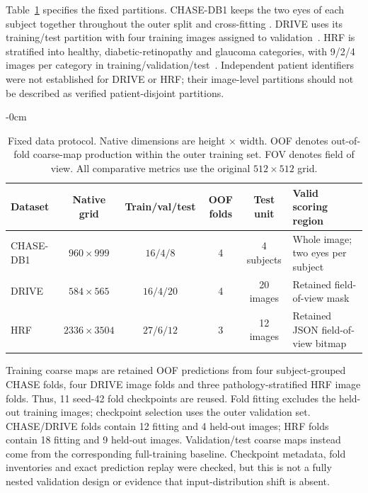 \documentclass[jimaging,article,submit,pdftex,moreauthors]{Definitions/mdpi}
\begin{document}
Table~\ref{tab:protocol} specifies the fixed partitions. CHASE-DB1 keeps the two
eyes of each subject together throughout the outer split and cross-fitting
\cite{Fraz2012}. DRIVE uses its training/test partition with four training
images assigned to validation~\cite{Staal2004}. HRF is stratified into healthy,
diabetic-retinopathy and glaucoma categories, with 9/2/4 images per category in
training/validation/test~\cite{Odstrcilik2013}. Independent patient identifiers
were not established for DRIVE or HRF; their image-level partitions should not
be described as verified patient-disjoint partitions.

\begin{table}[htbp]
\caption{Fixed data protocol. Native dimensions are height $\times$ width.
OOF denotes out-of-fold coarse-map production within the outer training set.
FOV denotes field of view.
All comparative metrics use the original $512\times512$ grid.}
\label{tab:protocol}
\begin{adjustwidth}{-\extralength}{0cm}
\centering\small
\begin{tabularx}{\linewidth}{@{}lccccX@{}}
\toprule
Dataset & Native grid & Train/val/test & OOF folds & Test unit & Valid scoring region\\
\midrule
CHASE-DB1 & $960\times999$ & $16/4/8$ & 4 & 4 subjects & Whole image; two eyes per subject\\
DRIVE & $584\times565$ & $16/4/20$ & 4 & 20 images & Retained field-of-view mask\\
HRF & $2336\times3504$ & $27/6/12$ & 3 & 12 images & Retained JSON field-of-view bitmap\\
\bottomrule
\end{tabularx}
\end{adjustwidth}
\end{table}

Training coarse maps are retained OOF predictions from four subject-grouped
CHASE folds, four DRIVE image folds and three pathology-stratified HRF image
folds. Thus, 11 seed-42 fold checkpoints are reused. Fold fitting excludes the
held-out training images; checkpoint selection uses the outer validation set.
CHASE/DRIVE folds contain 12 fitting and 4 held-out images; HRF folds contain
18 fitting and 9 held-out images. Validation/test coarse maps instead come
from the corresponding full-training baseline. Checkpoint metadata, fold
inventories and exact prediction replay were checked, but this is not a fully
nested validation design or evidence that input-distribution shift is absent.
\end{document}
